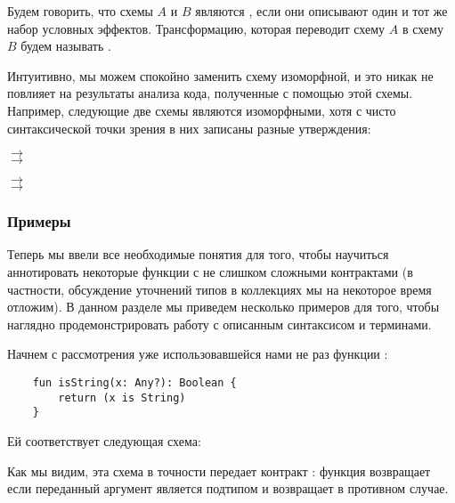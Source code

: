 \begin{definition}
    Будем говорить, что схемы $A$ и $B$ являются , если они описывают один и тот же набор условных эффектов. Трансформацию, которая переводит схему $A$ в схему $B$ будем называть .
\end{definition}

Интуитивно, мы можем спокойно заменить схему изоморфной, и это никак не повлияет на результаты анализа кода, полученные с помощью этой схемы. Например, следующие две схемы являются изоморфными, хотя с чисто синтаксической точки зрения в них записаны разные утверждения:

{
       $\rightarrow$  \\
     $\rightarrow$  \\
}{}

\bigskip

{
     $\rightarrow$  \\
       $\rightarrow$ 
}
{}



\subsubsection{Примеры}

Теперь мы ввели все необходимые понятия для того, чтобы научиться аннотировать некоторые функции с не слишком сложными контрактами (в частности, обсуждение уточнений типов в коллекциях мы на некоторое время отложим). В данном разделе мы приведем несколько примеров для того, чтобы наглядно продемонстрировать работу с описанным синтаксисом и терминами.

Начнем с рассмотрения уже использовавшейся нами не раз функции :

\begin{verbatim}
    fun isString(x: Any?): Boolean {
        return (x is String)
    }
\end{verbatim}

Ей соответствует следующая схема:

{}

Как мы видим, эта схема в точности передает контракт : функция возвращает  если переданный аргумент является подтипом  и возвращает  в противном случае. 

